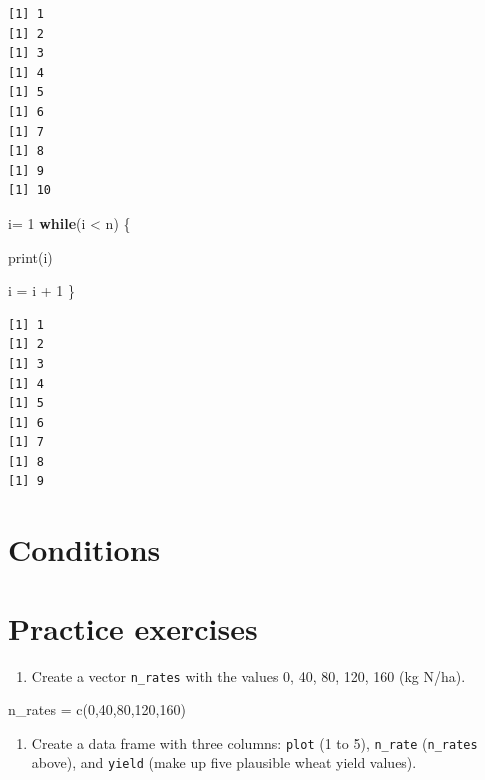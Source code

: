 \documentclass[
  letterpaper,
  DIV=11,
  numbers=noendperiod]{scrartcl}
\newenvironment{Shaded}{\begin{snugshade}}{\end{snugshade}}
\newcommand{\ControlFlowTok}[1]{\textcolor[rgb]{0.00,0.23,0.31}{\textbf{#1}}}
\newcommand{\DecValTok}[1]{\textcolor[rgb]{0.68,0.00,0.00}{#1}}
\newcommand{\FunctionTok}[1]{\textcolor[rgb]{0.28,0.35,0.67}{#1}}
\newcommand{\NormalTok}[1]{\textcolor[rgb]{0.00,0.23,0.31}{#1}}
\newcommand{\OtherTok}[1]{\textcolor[rgb]{0.00,0.23,0.31}{#1}}
\newcommand{\SpecialCharTok}[1]{\textcolor[rgb]{0.37,0.37,0.37}{#1}}
\providecommand{\tightlist}{%
  \setlength{\itemsep}{0pt}\setlength{\parskip}{0pt}}
\begin{document}
\begin{verbatim}
[1] 1
[1] 2
[1] 3
[1] 4
[1] 5
[1] 6
[1] 7
[1] 8
[1] 9
[1] 10
\end{verbatim}

\begin{Shaded}
\begin{Highlighting}[]
\NormalTok{i}\OtherTok{=} \DecValTok{1}
\ControlFlowTok{while}\NormalTok{(i }\SpecialCharTok{\textless{}}\NormalTok{ n) \{}
  
  \FunctionTok{print}\NormalTok{(i)}
  
\NormalTok{  i }\OtherTok{=}\NormalTok{ i }\SpecialCharTok{+} \DecValTok{1}
\NormalTok{\}}
\end{Highlighting}
\end{Shaded}

\begin{verbatim}
[1] 1
[1] 2
[1] 3
[1] 4
[1] 5
[1] 6
[1] 7
[1] 8
[1] 9
\end{verbatim}

\section{Conditions}\label{conditions}

\section{Practice exercises}\label{practice-exercises}

\begin{enumerate}
\def\labelenumi{\arabic{enumi}.}
\tightlist
\item
  Create a vector \texttt{n\_rates} with the values 0, 40, 80, 120, 160
  (kg N/ha).
\end{enumerate}

\begin{Shaded}
\begin{Highlighting}[]
\NormalTok{n\_rates }\OtherTok{=} \FunctionTok{c}\NormalTok{(}\DecValTok{0}\NormalTok{,}\DecValTok{40}\NormalTok{,}\DecValTok{80}\NormalTok{,}\DecValTok{120}\NormalTok{,}\DecValTok{160}\NormalTok{)}
\end{Highlighting}
\end{Shaded}

\begin{enumerate}
\def\labelenumi{\arabic{enumi}.}
\setcounter{enumi}{1}
\tightlist
\item
  Create a data frame with three columns: \texttt{plot} (1 to 5),
  \texttt{n\_rate} (\texttt{n\_rates} above), and \texttt{yield} (make
  up five plausible wheat yield values).
\end{enumerate}
\end{document}
